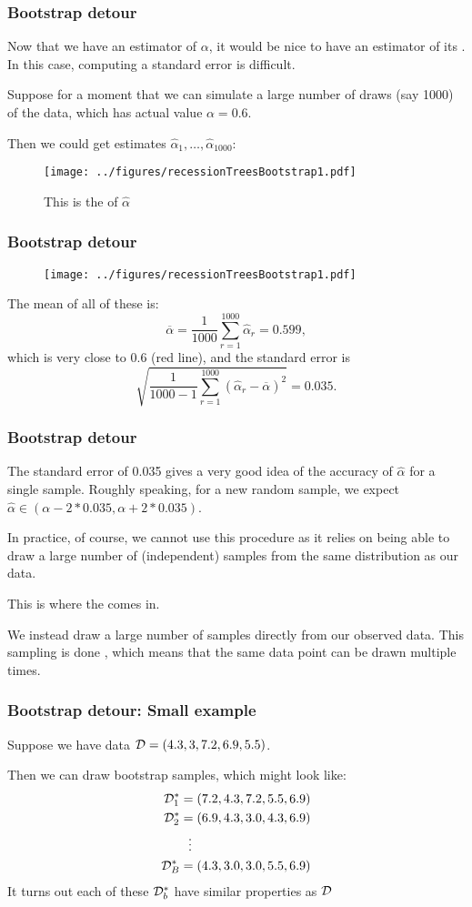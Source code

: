 \documentclass[12pt]{beamer}
\begin{document}
\begin{frame}[fragile]
\frametitle{Bootstrap detour}
Now that we have an estimator of $\alpha$, it would be nice to have an estimator of its .  In this
case, computing a standard error is difficult. 
\vsp

Suppose for a moment that we can simulate a large number of draws (say 1000) of the data, which has actual
value $\alpha = 0.6$. 

Then we could
get estimates $\hat\alpha_1 ,\ldots, \hat \alpha_{1000}$: 
\begin{figure}
\centering
\texttt{[image: ../figures/recessionTreesBootstrap1.pdf]}
\caption*{This is the  of $\hat\alpha$}
\end{figure}
\end{frame}

\begin{frame}[fragile]
\frametitle{Bootstrap detour}
\begin{figure}
\centering
\texttt{[image: ../figures/recessionTreesBootstrap1.pdf]}
\end{figure}

The mean of all of these is:
\[
\overline{\alpha} = \frac{1}{1000} \sum_{r=1}^{1000} \hat\alpha_r = 0.599,
\]
which is very close to 0.6 (red line), 
and the standard error is
\[
\sqrt{ \frac{1}{1000 -1} \sum_{r=1}^{1000} (\hat\alpha_r - \overline{\alpha})^2 }= 0.035.
\]
\end{frame}

\begin{frame}[fragile]
\frametitle{Bootstrap detour}
The standard error of  0.035 gives a very good idea of the accuracy of $\hat \alpha$ for a single sample.  Roughly
speaking, for a new random sample, we expect $\hat\alpha \in (\alpha - 2*0.035, \alpha + 2*0.035)$.

\vsp
In practice, of course, we cannot use this procedure as it relies on being able to draw a large number of 
(independent) samples from the same distribution as our data.  

\vsp
This is where the  comes in.

\vsp
We instead draw a large number of samples directly from our observed data.  This sampling is done
, which means that the same data point can be drawn multiple times.
\end{frame}

\begin{frame}[fragile]
\frametitle{Bootstrap detour: Small example}
Suppose we have data $\mathcal{D} = (4.3,3,7.2,6.9,5.5)$.

\vsp
Then we can draw bootstrap samples, which might look like:
\begin{align*}
\mathcal{D}_1^* &= (7.2,4.3,7.2,5.5,6.9) \\
\mathcal{D}_2^* &= (6.9, 4.3 ,3.0 ,4.3 ,6.9) \\
&\ \ \vdots \\
\mathcal{D}_B^* &= (4.3 ,3.0 ,3.0 ,5.5 ,6.9)
\end{align*}
It turns out each of these $\mathcal{D}_b^*$ have  similar properties as $\mathcal{D}$
\end{frame}
\end{document}
